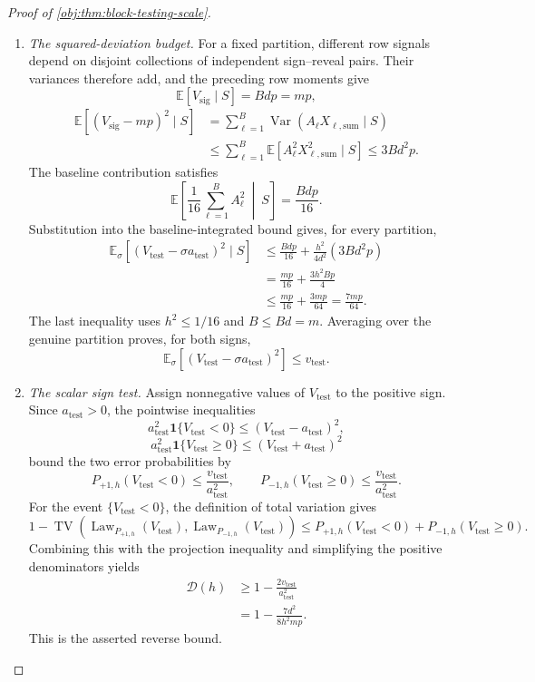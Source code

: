 \begin{proof}[Proof of \cref{obj:thm:block-testing-scale}]
\begin{enumerate}
\item \textit{The squared-deviation budget.}
For a fixed partition, different row signals depend on disjoint collections of independent sign--reveal pairs. Their variances therefore add, and the preceding row moments give
\[
\mathbb E[V_{\mathrm{sig}}\mid S]=Bdp=mp,
\]
\[
\begin{aligned}
\mathbb E[(V_{\mathrm{sig}}-mp)^2\mid S]
&=
\sum_{\ell=1}^{B}
\operatorname{Var}(A_\ell X_{\ell,\mathrm{sum}}\mid S)\\
&\le
\sum_{\ell=1}^{B}
\mathbb E[A_\ell^2X_{\ell,\mathrm{sum}}^2\mid S]
\le3Bd^2p.
\end{aligned}
\]
The baseline contribution satisfies
\[
\mathbb E\!\left[\frac1{16}\sum_{\ell=1}^{B}A_\ell^2
\ \middle|\ S\right]
=\frac{Bdp}{16}.
\]
Substitution into the baseline-integrated bound gives, for every partition,
\[
\begin{aligned}
\mathbb E_\sigma[
(V_{\mathrm{test}}-\sigma a_{\mathrm{test}})^2\mid S]
&\le
\frac{Bdp}{16}
+\frac{h^2}{4d^2}(3Bd^2p)\\
&=
\frac{mp}{16}+\frac{3h^2Bp}{4}\\
&\le
\frac{mp}{16}+\frac{3mp}{64}
=\frac{7mp}{64}.
\end{aligned}
\]
The last inequality uses \(h^2\le1/16\) and \(B\le Bd=m\). Averaging over the genuine partition proves, for both signs,
\[
\mathbb E_\sigma[
(V_{\mathrm{test}}-\sigma a_{\mathrm{test}})^2]
\le v_{\mathrm{test}}.
\]

\item \textit{The scalar sign test.}
Assign nonnegative values of \(V_{\mathrm{test}}\) to the positive sign. Since \(a_{\mathrm{test}}>0\), the pointwise inequalities
\[
a_{\mathrm{test}}^2\mathbf1\{V_{\mathrm{test}}<0\}
\le(V_{\mathrm{test}}-a_{\mathrm{test}})^2,
\]
\[
a_{\mathrm{test}}^2\mathbf1\{V_{\mathrm{test}}\ge0\}
\le(V_{\mathrm{test}}+a_{\mathrm{test}})^2
\]
bound the two error probabilities by
\[
P_{+1,h}(V_{\mathrm{test}}<0)
\le\frac{v_{\mathrm{test}}}{a_{\mathrm{test}}^2},
\qquad
P_{-1,h}(V_{\mathrm{test}}\ge0)
\le\frac{v_{\mathrm{test}}}{a_{\mathrm{test}}^2}.
\]
For the event \(\{V_{\mathrm{test}}<0\}\), the definition of total variation gives
\[
1-\operatorname{TV}\!\left(
\operatorname{Law}_{P_{+1,h}}(V_{\mathrm{test}}),
\operatorname{Law}_{P_{-1,h}}(V_{\mathrm{test}})
\right)
\le
P_{+1,h}(V_{\mathrm{test}}<0)
+
P_{-1,h}(V_{\mathrm{test}}\ge0).
\]
Combining this with the projection inequality and simplifying the positive denominators yields
\[
\begin{aligned}
\mathcal D(h)
&\ge1-\frac{2v_{\mathrm{test}}}{a_{\mathrm{test}}^2}\\
&=
1-\frac{7d^2}{8h^2mp}.
\end{aligned}
\]
This is the asserted reverse bound.


\end{enumerate}
\end{proof}

